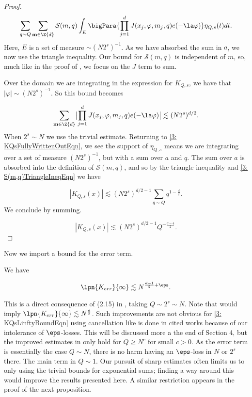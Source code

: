 \documentclass[11pt]{amsart}
\begin{document}
\begin{proof}
\begin{equation*}
\sum_{q\sim Q}\sum_{\mathbf{m}\in\Z{d}}\mathcal{S}(m,q)\int_{E}\bigPara{\prod_{j=1}^dJ(x_j,\varphi,m_j,q)e(-\la\varphi)}\eta_{Q,s}(t)dt.
\end{equation*}
Here, $E$ is a set of measure $\sim (N2^s)^{-1}$. As we have absorbed the sum in $a$, we now use the triangle inequality. Our bound for $\mathcal{S}(m,q)$ is independent of $m$, so, much like in the proof of , we focus on the $J$ term to sum. 

Over the domain we are integrating in the expression for $K_{Q,s}$, we have that $|\varphi|\sim (N2^s)^{-1}$. So this bound becomes

\begin{equation*}
    \sum_{\mathbf{m}\in\Z{d}}\bigl|\prod_{j=1}^dJ(x_j,\varphi,m_j,q)e(-\la\varphi)\bigr|\lesssim (N2^s)^{d/2}.
\end{equation*}
When $2^s\sim N$ we use the trivial estimate. Returning to \eqref{3: KQsFullyWrittenOutEqn}, we see the support of $\eta_{Q,s}$ means we are integrating over a set of measure $(N2^s)^{-1}$, but with a sum over $a$ and $q$. The sum over $a$ is absorbed into the definition of $\mathcal{S}(m,q)$, and so by the triangle inequality and \eqref{3: S(m,q)TriangleIneqEqn} we have

\begin{equation*}
    |K_{Q,s}(x)|\lesssim (N2^s)^{d/2-1}\sum_{q\sim Q}q^{1-\frac{d}{2}}.
\end{equation*}
We conclude by summing.

\begin{equation*}
    |K_{Q,s}(x)|\lesssim (N2^s)^{d/2-1}Q^{-\frac{d-4}{2}}.
\end{equation*}
\end{proof}
\noindent
Now we import a bound for the error term.

\begin{proposition}\label{3: KerrSpaceBoundProp}
    We have

    \begin{equation}\label{3: KerrSpaceBoundEqn}
        \lpn{K_{err}}{\infty}\lesssim N^{\frac{d-1}{2}+\eps}.
    \end{equation}
\end{proposition}
This is a direct consequence of (2.15) in \cite{bourgainTorusEFunc1993}, taking $Q\sim 2^s\sim N$. Note that  would imply $\lpn{K_{err}}{\infty}\lesssim N^{\frac{d}{2}}$. Such improvements are not obvious for \eqref{3: KQsLinftyBoundEqn} using cancellation like is done in cited works because of our intolerance of $\eps$-losses. This will be discussed more a the end of Section 4, but the improved estimates in \cite{bourgainDemeterDiscreteRestrictImprovements2013} only hold for $Q\geq N^{c}$ for small $c>0$. As the error term is essentially the case $Q\sim N$, there is no harm having an $\eps$-loss in $N$ or $2^s$ there. The main term in $Q\sim 1$. Our pursuit of sharp estimates often limits us to only using the trivial bounds for exponential sums; finding a way around this would improve the results presented here. A similar restriction appears in the proof of the next proposition.
\end{document}
